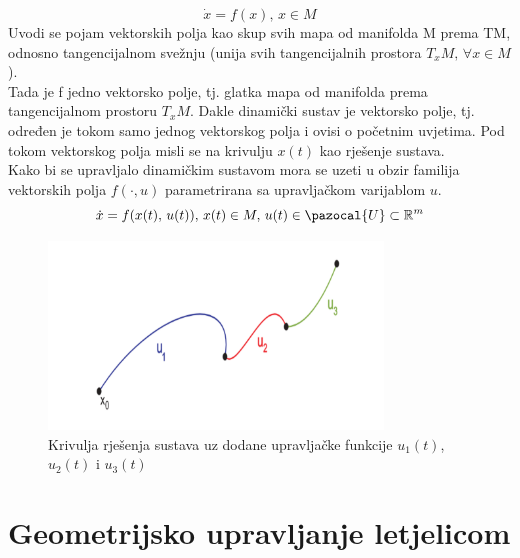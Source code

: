 \documentclass[times, utf8, diplomski]{fer}
\newcommand{\Ua}{\pazocal{U}}
\begin{document}
	\begin{equation}
		\dot{x}=f(x), \, x \in M
	\end{equation}
	Uvodi se pojam vektorskih polja kao skup svih mapa od manifolda M prema TM, odnosno tangencijalnom svežnju (unija svih tangencijalnih prostora $T_xM ,\, \forall x\in M$). \\
	Tada je f jedno vektorsko polje, tj. glatka mapa od manifolda prema tangencijalnom prostoru $T_xM$. Dakle dinamički sustav je vektorsko polje, tj. određen je tokom samo jednog vektorskog polja i ovisi o početnim uvjetima. Pod tokom vektorskog polja misli se na krivulju $x(t)$ kao rješenje sustava. \\
	Kako bi se upravljalo dinamičkim sustavom mora se uzeti u obzir familija vektorskih polja $f(\cdot, u)$ parametrirana sa upravljačkom varijablom $u$. \\
	\begin{equation}
		\dot{x} = f(x(t),\, u(t)), \, x(t)\in M, \, u(t)\in \Ua \subset \mathbb{R}^m
	\end{equation}
	\begin{figure}[h!]
		\includegraphics[width=\textwidth, height=5cm]{krivulja.png}
		\caption{Krivulja rješenja sustava uz dodane upravljačke funkcije $u_1(t)$, $u_2(t)$ i $u_3(t)$}
	\end{figure}
	
	\newpage
	\clearpage
	
\section{Geometrijsko upravljanje letjelicom}
	
\end{document}
